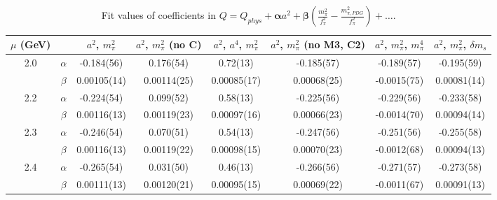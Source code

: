 \documentclass[12pt]{extarticle}
\begin{document}
\begin{table}[h!]
\begin{center}
\begin{tabular}{|c c|c|c|c|c|c|c|}
\hline
$\mu$ (GeV) &  & $a^2$, $m_\pi^2$& $a^2$, $m_\pi^2$ (no C)& $a^2$, $a^4$, $m_\pi^2$& $a^2$, $m_\pi^2$ (no M3, C2)& $a^2$, $m_\pi^2$, $m_\pi^4$& $a^2$, $m_\pi^2$, $\delta m_s$\\
\hline
\multirow{2}{0.5in}{2.0} & $\alpha$ & -0.184(56)& 0.176(54)& 0.72(13)& -0.185(57)& -0.189(57)& -0.195(59)\\
 & $\beta$ & 0.00105(14)& 0.00114(25)& 0.00085(17)& 0.00068(25)& -0.0015(75)& 0.00081(14)\\
\hline
\multirow{2}{0.5in}{2.2} & $\alpha$ & -0.224(54)& 0.099(52)& 0.58(13)& -0.225(56)& -0.229(56)& -0.233(58)\\
 & $\beta$ & 0.00116(13)& 0.00119(23)& 0.00097(16)& 0.00066(23)& -0.0014(70)& 0.00094(14)\\
\hline
\multirow{2}{0.5in}{2.3} & $\alpha$ & -0.246(54)& 0.070(51)& 0.54(13)& -0.247(56)& -0.251(56)& -0.255(58)\\
 & $\beta$ & 0.00116(13)& 0.00119(22)& 0.00098(15)& 0.00070(23)& -0.0012(68)& 0.00094(13)\\
\hline
\multirow{2}{0.5in}{2.4} & $\alpha$ & -0.265(54)& 0.031(50)& 0.46(13)& -0.266(56)& -0.271(57)& -0.273(58)\\
 & $\beta$ & 0.00111(13)& 0.00120(21)& 0.00095(15)& 0.00069(22)& -0.0011(67)& 0.00091(13)\\
\hline
\end{tabular}
\caption{Fit values of coefficients in $Q = Q_{phys} + \mathbf{\alpha} a^2 + \mathbf{\beta}\left(\frac{m_\pi^2}{f_\pi^2}-\frac{m_{\pi,PDG}^2}{f_\pi^2}\right) + \ldots$.}
\end{center}
\end{table}
























\clearpage
\end{document}
